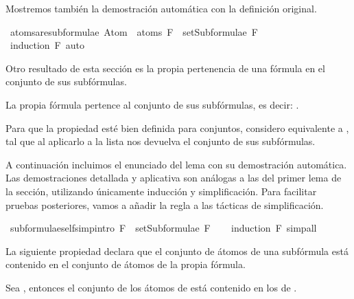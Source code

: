 \begin{isabellebody}
{\isafoldproof}%
%
\isadelimproof
%
\endisadelimproof
%
\begin{isamarkuptext}%
Mostremos también la demostración automática con la definición original.%
\end{isamarkuptext}\isamarkuptrue%
\isamarkupfalse%
\ atoms{\isacharunderscore}are{\isacharunderscore}subformulae{\isacharcolon}\ {\isachardoublequoteopen}Atom\ {\isacharbackquote}\ atoms\ F\ {\isasymsubseteq}\ setSubformulae\ F{\isachardoublequoteclose}\isanewline
%
\isadelimproof
\ \ %
\endisadelimproof
%
\isatagproof
{}\isamarkupfalse%
\ {\isacharparenleft}induction\ F{\isacharparenright}\ auto%
\endisatagproof
{\isafoldproof}%
%
\isadelimproof
%
\endisadelimproof
%
\begin{isamarkuptext}%
Otro resultado de esta sección es la propia pertenencia de una fórmula en el conjunto 
de sus subfórmulas. 

\begin{lema}
    La propia fórmula pertence al conjunto de sus subfórmulas, es decir: .
  \end{lema}
Para que la propiedad esté bien definida para conjuntos, considero  equivalente
a , tal que al aplicarlo a la lista  nos devuelva el conjunto
de sus subfórmulas.

A continuación incluimos el enunciado del lema con su demostración automática. Las demostraciones 
detallada y aplicativa son análogas a las del primer lema de la sección, utilizando únicamente 
inducción y simplificación. Para facilitar pruebas posteriores, vamos a añadir la regla a las 
tácticas de simplificación.%
\end{isamarkuptext}\isamarkuptrue%
\isamarkupfalse%
\ subformulae{\isacharunderscore}self{\isacharbrackleft}simp{\isacharcomma}intro{\isacharbrackright}{\isacharcolon}\ {\isachardoublequoteopen}F\ {\isasymin}\ setSubformulae\ F{\isachardoublequoteclose}\isanewline
%
\isadelimproof
\ \ %
\endisadelimproof
%
\isatagproof
{}\isamarkupfalse%
\ {\isacharparenleft}induction\ F{\isacharparenright}\ simp{\isacharunderscore}all%
\endisatagproof
{\isafoldproof}%
%
\isadelimproof
%
\endisadelimproof
%
\begin{isamarkuptext}%
La siguiente propiedad declara que el conjunto de átomos de una subfórmula está contenido en el
conjunto de átomos de la propia fórmula.
\begin{lema}
    Sea , entonces el conjunto de los átomos de  está contenido en los de .
  \end{lema}


\end{isamarkuptext}
\end{isabellebody}
